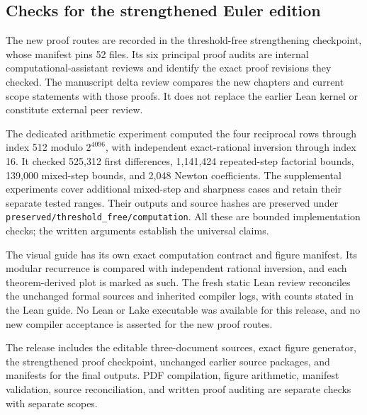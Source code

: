 \subsection{Checks for the strengthened Euler edition}
The new proof routes are recorded in the threshold-free strengthening checkpoint, whose manifest pins 52 files. Its six principal proof audits are internal computational-assistant reviews and identify the exact proof revisions they checked. The manuscript delta review compares the new chapters and current scope statements with those proofs. It does not replace the earlier Lean kernel or constitute external peer review.

The dedicated arithmetic experiment computed the four reciprocal rows through index 512 modulo $2^{4096}$, with independent exact-rational inversion through index 16. It checked 525,312 first differences, 1,141,424 repeated-step factorial bounds, 139,000 mixed-step bounds, and 2,048 Newton coefficients. The supplemental experiments cover additional mixed-step and sharpness cases and retain their separate tested ranges. Their outputs and source hashes are preserved under \nolinkurl{preserved/threshold_free/computation}. All these are bounded implementation checks; the written arguments establish the universal claims.

The visual guide has its own exact computation contract and figure manifest. Its modular recurrence is compared with independent rational inversion, and each theorem-derived plot is marked as such. The fresh static Lean review reconciles the unchanged formal sources and inherited compiler logs, with counts stated in the Lean guide. No Lean or Lake executable was available for this release, and no new compiler acceptance is asserted for the new proof routes.

The release includes the editable three-document sources, exact figure generator, the strengthened proof checkpoint, unchanged earlier source packages, and manifests for the final outputs. PDF compilation, figure arithmetic, manifest validation, source reconciliation, and written proof auditing are separate checks with separate scopes.
